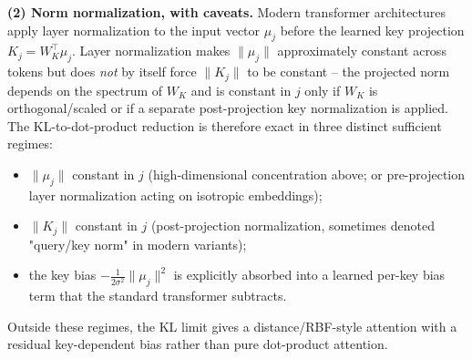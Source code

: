 \documentclass[11pt]{article}
\begin{document}
\textbf{(2) Norm normalization, with caveats.}
Modern transformer architectures apply layer normalization to the input vector $\mu_j$ before the learned key projection $K_j = W_K^\top \mu_j$. Layer normalization makes $\|\mu_j\|$ approximately constant across tokens but does \emph{not} by itself force $\|K_j\|$ to be constant -- the projected norm depends on the spectrum of $W_K$ and is constant in $j$ only if $W_K$ is orthogonal/scaled or if a separate post-projection key normalization is applied. The KL-to-dot-product reduction is therefore exact in three distinct sufficient regimes:
\begin{itemize}
\item $\|\mu_j\|$ constant in $j$ (high-dimensional concentration above; or pre-projection layer normalization acting on isotropic embeddings);
\item $\|K_j\|$ constant in $j$ (post-projection normalization, sometimes denoted "query/key norm" in modern variants);
\item the key bias $-\tfrac{1}{2\sigma^2}\|\mu_j\|^2$ is explicitly absorbed into a learned per-key bias term that the standard transformer subtracts.
\end{itemize}
Outside these regimes, the KL limit gives a distance/RBF-style attention with a residual key-dependent bias rather than pure dot-product attention.
\end{document}
